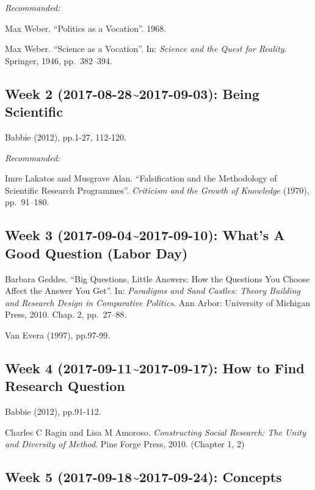 \documentclass[11pt,]{article}
\begin{document}
\emph{Recommanded:}

Max Weber. ``Politics as a Vocation''. 1968.

Max Weber. ``Science as a Vocation''. In:
\emph{Science and the Quest for Reality}. Springer, 1946, pp.~382--394.

\subsection{Week 2 (2017-08-28\textasciitilde{}2017-09-03): Being
Scientific}\label{week-2-2017-08-282017-09-03-being-scientific}

Babbie (2012), pp.1-27, 112-120.

\emph{Recommanded:}

Imre Lakatos and Musgrave Alan. ``Falsification and the Methodology of
Scientific Research Programmes''.
\emph{Criticism and the Growth of Knowledge} (1970), pp.~91--180.

\subsection{Week 3 (2017-09-04\textasciitilde{}2017-09-10): What's A
Good Question (Labor
Day)}\label{week-3-2017-09-042017-09-10-whats-a-good-question-labor-day}

Barbara Geddes. ``Big Questions, Little Answers: How the Questions You
Choose Affect the Answer You Get''. In:
\emph{Paradigms and Sand Castles: Theory Building and Research Design in Comparative Politics}.
Ann Arbor: University of Michigan Press, 2010. Chap. 2, pp.~27--88.

Van Evera (1997), pp.97-99.

\subsection{Week 4 (2017-09-11\textasciitilde{}2017-09-17): How to Find
Research
Question}\label{week-4-2017-09-112017-09-17-how-to-find-research-question}

Babbie (2012), pp.91-112.

Charles C Ragin and Lisa M Amoroso.
\emph{Constructing Social Research: The Unity and Diversity of Method}.
Pine Forge Press, 2010. (Chapter 1, 2)

\subsection{Week 5 (2017-09-18\textasciitilde{}2017-09-24):
Concepts}\label{week-5-2017-09-182017-09-24-concepts}
\end{document}
